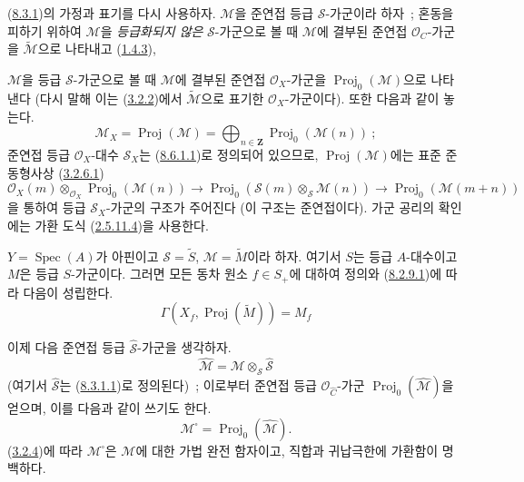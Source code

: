 \begin{env}[8.12.1]
\label{II.8.12.1-ko}
(\hyperref[II.8.3.1-ko]{8.3.1})의 가정과 표기를 다시 사용하자.
$\mathcal{M}$을 준연접 등급 $\mathcal{S}$-가군이라 하자~; 혼동을
피하기 위하여 $\mathcal{M}$을 \emph{등급화되지 않은}
$\mathcal{S}$-가군으로 볼 때 $\mathcal{M}$에 결부된 준연접
$\mathcal{O}_C$-가군을 $\widetilde{\mathcal{M}}$으로 나타내고
(\hyperref[II.1.4.3-ko]{1.4.3}),

$\mathcal{M}$을 등급 $\mathcal{S}$-가군으로 볼 때 $\mathcal{M}$에
결부된 준연접 $\mathcal{O}_X$-가군을
$\operatorname{Proj}_0(\mathcal{M})$으로 나타낸다 (다시 말해 이는
(\hyperref[II.3.2.2-ko]{3.2.2})에서
$\widetilde{\mathcal{M}}$으로 표기한 $\mathcal{O}_X$-가군이다).
또한 다음과 같이 놓는다.
\begin{equation}
\label{II.8.12.1.1-ko}
  \mathcal{M}_X=\operatorname{Proj}(\mathcal{M})
  =\bigoplus_{n\in\mathbf{Z}}\operatorname{Proj}_0(\mathcal{M}(n))~;
\tag{8.12.1.1}
\end{equation}
준연접 등급 $\mathcal{O}_X$-대수 $\mathcal{S}_X$는
(\hyperref[II.8.6.1.1-ko]{8.6.1.1})로 정의되어 있으므로,
$\operatorname{Proj}(\mathcal{M})$에는 표준 준동형사상
(\hyperref[II.3.2.6.1-ko]{3.2.6.1})
\begin{equation}
\label{II.8.12.1.2-ko}
  \mathcal{O}_X(m)\otimes_{\mathcal{O}_X}
  \operatorname{Proj}_0(\mathcal{M}(n))
  \to \operatorname{Proj}_0(\mathcal{S}(m)\otimes_{\mathcal{S}}\mathcal{M}(n))
  \to \operatorname{Proj}_0(\mathcal{M}(m+n))
\tag{8.12.1.2}
\end{equation}
을 통하여 등급 $\mathcal{S}_X$-가군의 구조가 주어진다 (이 구조는
준연접이다). 가군 공리의 확인에는 가환 도식
(\hyperref[II.2.5.11.4-ko]{2.5.11.4})을 사용한다.

$Y=\operatorname{Spec}(A)$가 아핀이고 $\mathcal{S}=\widetilde{S}$,
$\mathcal{M}=\widetilde{M}$이라 하자. 여기서 $S$는 등급 $A$-대수이고
$M$은 등급 $S$-가군이다. 그러면 모든 동차 원소 $f\in S_+$에 대하여
정의와 (\hyperref[II.8.2.9.1-ko]{8.2.9.1})에 따라 다음이 성립한다.
\begin{equation}
\label{II.8.12.1.3-ko}
  \Gamma(X_f,\operatorname{Proj}(\widetilde{M}))=M_f
\tag{8.12.1.3}
\end{equation}

이제 다음 준연접 등급 $\widehat{\mathcal{S}}$-가군을 생각하자.
\begin{equation}
\label{II.8.12.1.4-ko}
  \widehat{\mathcal{M}}
  =\mathcal{M}\otimes_{\mathcal{S}}\widehat{\mathcal{S}}
\tag{8.12.1.4}
\end{equation}
(여기서 $\widehat{\mathcal{S}}$는
(\hyperref[II.8.3.1.1-ko]{8.3.1.1})로 정의된다)~; 이로부터 준연접
등급 $\mathcal{O}_{\widehat{C}}$-가군
$\operatorname{Proj}_0(\widehat{\mathcal{M}})$을 얻으며, 이를 다음과
같이 쓰기도 한다.
\begin{equation}
\label{II.8.12.1.5-ko}
  \mathcal{M}^{\square}=\operatorname{Proj}_0(\widehat{\mathcal{M}}).
\tag{8.12.1.5}
\end{equation}
(\hyperref[II.3.2.4-ko]{3.2.4})에 따라 $\mathcal{M}^{\square}$은
$\mathcal{M}$에 대한 가법 완전 함자이고, 직합과
귀납극한에 가환함이 명백하다.
\end{env}

